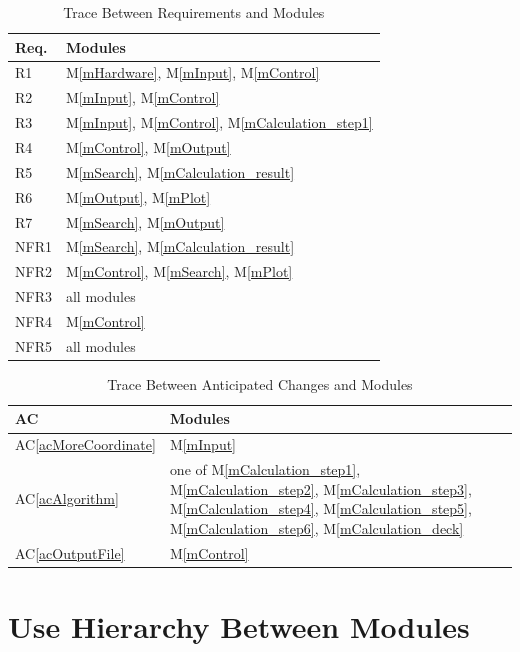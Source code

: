 \documentclass[12pt, titlepage]{article}
\newcommand{\acref}[1]{AC\ref{#1}}
\newcommand{\mref}[1]{M\ref{#1}}
\begin{document}
\begin{table}[H]
\centering
\begin{tabular}{p{} p{}}
\toprule
\textbf{Req.} & \textbf{Modules}\\
\midrule
R1 & \mref{mHardware}, \mref{mInput}, \mref{mControl}\\
R2 & \mref{mInput}, \mref{mControl}\\
R3 & \mref{mInput}, \mref{mControl}, \mref{mCalculation_step1}\\
R4 & \mref{mControl}, \mref{mOutput}\\
R5 & \mref{mSearch}, \mref{mCalculation_result}\\
R6 &  \mref{mOutput}, \mref{mPlot}\\
R7 &  \mref{mSearch}, \mref{mOutput}\\
NFR1 & \mref{mSearch}, \mref{mCalculation_result}\\
NFR2 & \mref{mControl},  \mref{mSearch}, \mref{mPlot}\\
NFR3 & all modules\\
NFR4 & \mref{mControl}\\
NFR5 & all modules\\

\bottomrule
\end{tabular}
\caption{Trace Between Requirements and Modules}
\label{TblRT}
\end{table}

\begin{table}[H]
\centering
\begin{tabular}{p{} p{}}
\toprule
\textbf{AC} & \textbf{Modules}\\
\midrule
\acref{acMoreCoordinate} & \mref{mInput}\\
\acref{acAlgorithm} & one of \mref{mCalculation_step1}, \mref{mCalculation_step2}, \mref{mCalculation_step3}, \mref{mCalculation_step4}, \mref{mCalculation_step5}, \mref{mCalculation_step6}, \mref{mCalculation_deck}\\
\acref{acOutputFile} & \mref{mControl} \\
\bottomrule
\end{tabular}
\caption{Trace Between Anticipated Changes and Modules}
\label{TblACUCT}
\end{table}

\section{Use Hierarchy Between Modules} \label{SecUse}
\end{document}
